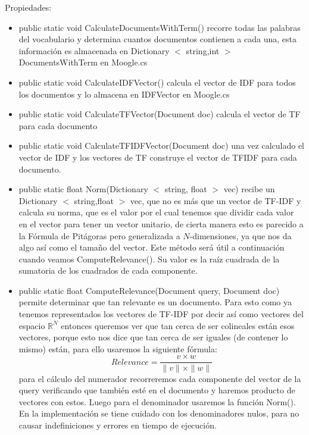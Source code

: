 \documentclass[a4paper,12pt]{article}
\begin{document}
Propiedades:
\begin{itemize}
    \item public static void CalculateDocumentsWithTerm() recorre todas las palabras del vocabulario y
    determina cuantos documentos contienen a cada una, esta información es
    almacenada en Dictionary $<$ string,int $>$ DocumentsWithTerm en Moogle.cs
    \item public static void CalculateIDFVector() calcula el vector de IDF para todos los documentos y lo
    almacena en IDFVector en Moogle.cs
    \item public static void CalculateTFVector(Document doc) calcula el vector de TF para cada documento
    \item public static void CalculateTFIDFVector(Document doc) una vez calculado el vector de IDF y los vectores de TF
    construye el vector de TFIDF para cada documento.
    \item public static float Norm(Dictionary $<$ string, float $>$ vec) recibe un Dictionary $<$ string,float $>$ vec, que no es más que un vector de
    TF-IDF y calcula su norma, que es el valor por el cual tenemos que dividir cada
    valor en el vector para tener un vector unitario, de cierta manera esto es parecido a
    la Fórmula de Pitágoras pero generalizada a $N$-dimensiones, ya que nos da algo
    así como el tamaño del vector. Este método será útil a continuación cuando
    veamos ComputeRelevance(). Su valor es la raíz cuadrada de la sumatoria de los
    cuadrados de cada componente.
    \item public static float ComputeRelevance(Document query, Document doc) permite determinar que tan relevante es un documento. Para
    esto como ya tenemos representados los vectores de TF-IDF por decir así como
    vectores del espacio $\mathbb{R}^{N}$ entonces queremos ver que tan cerca de ser colineales
    están esos vectores, porque esto nos dice que tan cerca de ser iguales (de contener
    lo mismo) están, para ello usaremos la siguiente fórmula:
    \begin{equation}\label{eq:cosine-similarity}
        Relevance = \frac{v \times w}{\|v\| \times \|w\|}
    \end{equation}
    para el cálculo del numerador recorreremos cada componente del vector de la
    query verificando que también esté en el documento y haremos producto de
    vectores con estos. Luego para el denominador usaremos la función Norm().
    En la implementación se tiene cuidado con los denominadores nulos, para no
    causar indefiniciones y errores en tiempo de ejecución.
\end{itemize}
\end{document}
